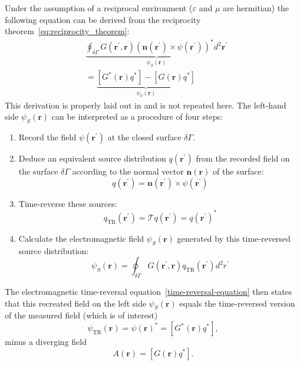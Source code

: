 Under the assumption of a reciprocal environment (\(\varepsilon \) and \(\mu \) are hermitian) the following equation can be derived from the reciprocity theorem~\eqref{eq:reciprocity_theorem}:
\begin{equation}\label{time-reversal-equation}
    \begin{aligned}
    & \underbrace{\oint_{\delta \Gamma} G(\bm{r}^{\prime}, \bm{r}) {\left(\bm{n}\left(\bm{r}^{\prime}\right) \times  \psi(\bm{r}^{\prime}) \right)}^* d^2 \bm{r}^{\prime}}_{\psi_S(\bm{r})} \\
    &=\underbrace{[G^*(\bm{r}) q^*] - [G(\bm{r}) q^*]}_{\psi_V(\bm{r})}
    \end{aligned}
\end{equation}
This derivation is properly laid out  in \parencite{de_rosny_theory_2010} and is not repeated here.
The left-hand side \(\psi_S(\bm{r})\) can be interpreted as a procedure of four steps:
\begin{enumerate}
    \item Record the field \(\psi(\bm{r}^{\prime}) \) at the closed surface \(\delta \Gamma \).
    \item Deduce an equivalent source distribution \(q(\bm{r}^{\prime})\) from the recorded field on the surface \(\delta \Gamma \) according to the normal vector \(\bm{n}(\bm{r})\) of the surface: 
    \begin{equation}
        q(\bm{r}^{\prime}) = \bm{n}(\bm{r}^{\prime}) \times \psi(\bm{r}^{\prime})
    \end{equation}
    \item Time-reverse these sources:
    \begin{equation}
        q_{\text{TR}}(\bm{r}^{\prime}) = \mathcal{T}q(\bm{r}^{\prime}) = {q(\bm{r}^{\prime})}^*
    \end{equation}
    \item Calculate the electromagnetic field \(\psi_S(\bm{r})\) generated by this time-reversed source distribution:
    \begin{equation}
        \psi_S(\bm{r}) = \oint_{\delta \Gamma} G(\bm{r}^{\prime}, \bm{r}) q_{\text{TR}}(\bm{r}^{\prime}) d^2 r^{\prime}
    \end{equation}
\end{enumerate}
The electromagnetic time-reversal equation~\eqref{time-reversal-equation} then states that this recreated field on the left side \(\psi_S(\bm{r})\) equals the time-reversed version of the measured field (which is of interest)
\begin{equation}
    \psi_{\text{TR}}(\bm{r}) = \psi{(\bm{r})}^* = [G^*(\bm{r}) q^*],
\end{equation}
minus a diverging field
\begin{equation}
    A(\bm{r}) = [G(\bm{r}) q^*].
\end{equation}

